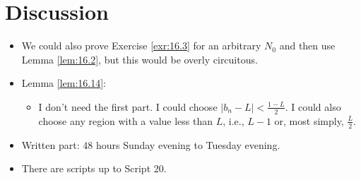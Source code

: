 \documentclass{report}
\begin{document}



\section{Discussion}
\begin{itemize}
    \item {}We could also prove Exercise \ref{exr:16.3} for an arbitrary $N_0$ and then use Lemma \ref{lem:16.2}, but this would be overly circuitous.
    \item {}Lemma \ref{lem:16.14}:
    \begin{itemize}
        \item I don't need the first part. I could choose $|b_n-L|<\frac{1-L}{2}$. I could also choose any region with a value less than $L$, i.e., $L-1$ or, most simply, $\frac{L}{2}$.
    \end{itemize}
    \item Written part: 48 hours Sunday evening to Tuesday evening.
    \item There are scripts up to Script 20.
\end{itemize}



\renewcommand{\chaptermark}[1]{\markboth{#1}{}}




\renewcommand{\chaptermark}[1]{\markboth{\chaptername\ \thechapter}{}}

\end{document}
